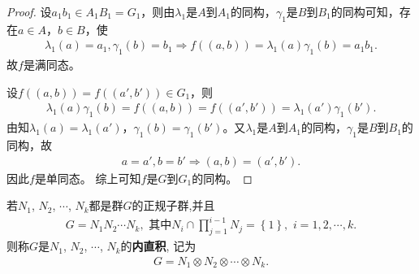 \documentclass[../../main.tex]{subfiles}%
\begin{document}
\begin{proof}
设$a_1b_1\in A_1B_1=G_1$，则由$\lambda_1$是$A$到$A_1$的同构，$\gamma_1$是$B$到$B_1$的同构可知，存在$a\in A$，$b\in B$，使
\begin{align*}
\lambda_1(a)=a_1,\gamma_1(b)=b_1\Longrightarrow f((a,b))=\lambda_1(a)\gamma_1(b)=a_1b_1.
\end{align*}
故$f$是满同态。

设$f((a,b))=f((a',b'))\in G_1$，则
\begin{align*}
\lambda_1(a)\gamma_1(b)=f((a,b))=f((a',b'))=\lambda_1(a')\gamma_1(b').
\end{align*}
由知$\lambda_1(a)=\lambda_1(a')$，$\gamma_1(b)=\gamma_1(b')$。又$\lambda_1$是$A$到$A_1$的同构，$\gamma_1$是$B$到$B_1$的同构，故
\begin{align*}
a=a',b=b'\Longrightarrow (a,b)=(a',b').
\end{align*}
因此$f$是单同态。
综上可知$f$是$G$到$G_1$的同构。
\end{proof}

\begin{definition}
若$N_1$, $N_2$, $\cdots$, $N_k$都是群$G$的正规子群,并且
\begin{align*}
G = N_1N_2\cdots N_k,\,\,\text{其中}N_i\cap \prod_{j=1}^{i-1}{N_j}=\left\{ 1 \right\} ,\,\,i=1,2,\cdots ,k.
\end{align*}
则称$G$是$N_1$, $N_2$, $\cdots$, $N_k$的\textbf{内直积}, 记为
\begin{align*}
G = N_1\otimes N_2\otimes\cdots\otimes N_k.
\end{align*}
\end{definition}
\end{document}
